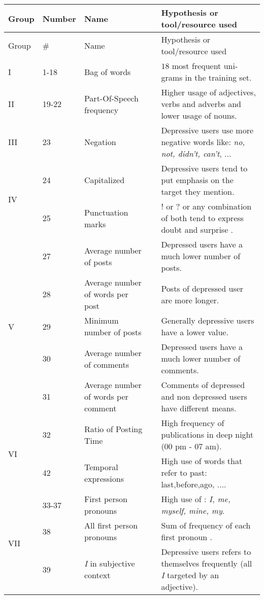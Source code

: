 \begin{longtable}{llp{3.5cm}p{0.3cm}p{6.5cm}} 
\caption{} \\
Group & Number & Name & & Hypothesis or tool/resource used\\
\hline
\endfirsthead

Group & \# & Name & & Hypothesis or tool/resource used\\
\hline \endhead
I & 1-18 & Bag of words & & $18$ most frequent uni-grams in the training set.\\[3pt]
\hline
II & 19-22 & Part-Of-Speech frequency & & Higher usage of adjectives, verbs and adverbs and lower usage of nouns.\\[3pt]
\hline
III & 23 & Negation && Depressive users use more negative words like: \textit{no, not, didn’t, can't}, ... \\[3pt]
\hline
\multirow{2}{*}{IV}
& 24 & Capitalized & & Depressive users tend to put emphasis on the target they mention.\\[3pt]
& 25 & Punctuation marks & & ! or ? or any combination of both tend to express doubt and surprise .\\ [3pt]
\hline
\multirow{5}{*}{V} 
& 27 & Average number of posts & & Depressed users have a much lower number of posts.\\[3pt]
& 28 & Average number of words per post&& Posts of depressed user are more longer.\\[3pt]
& 29 & Minimum number of posts && Generally depressive users have a lower value.\\[3pt]
& 30 & Average number of comments && Depressed users have a much lower number of comments.\\[3pt]
& 31 & Average number of words per comment && Comments of depressed and non depressed users have different means.\\[3pt]
\hline
\multirow{2}{*}{VI} 
& 32 & Ratio of Posting Time && High frequency of publications in deep night (00 pm - 07 am).\\[3pt]
& 42 & Temporal expressions && High use of words that refer to past: last,before,ago, ....\\[3pt]
\hline
\multirow{4}{*}{VII} 
& 33-37 & First person pronouns&& High use of : \textit{I, me, myself, mine, my}.\\[3pt]
& 38 & All first person pronouns &&Sum of frequency of each first pronoun .\\[3pt]
& 39 & \textit{I} in subjective context && Depressive users refers to themselves frequently (all \textit{I} targeted by an adjective).\\[3pt]

\end{longtable}
